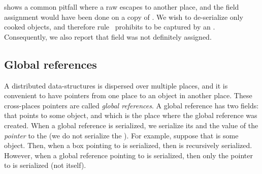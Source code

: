  shows a common pitfall
    where a raw \this escapes to another place,
    and the field assignment would have been done on a copy of \this.
We wish to de-serialize only cooked objects,
    and therefore rule~ prohibits \this to be captured by an .
Consequently, we also report that field  was not definitely assigned.



\subsection{Global references}
\label{Section:Global-references}
A distributed data-structures is dispersed over multiple places,
    and it is convenient to have pointers from one place to an object in another place.
These cross-places pointers are called \emph{global references}.
A global reference has two fields:  that points to some object,
    and  which is the place where the global reference was created.
When a global reference is serialized, we serialize its  and the value of the \emph{pointer} to the 
    (we do not serialize the ).
For example, suppose that  is some object.
Then, when a box pointing to  is serialized, then  is recursively serialized.
However, when a global reference pointing to  is serialized, then only the pointer to  is serialized (not  itself).


